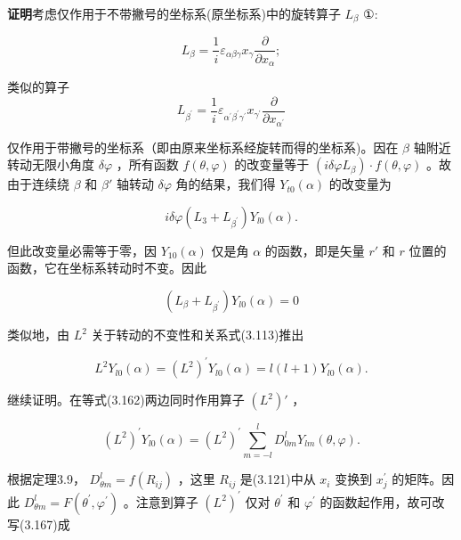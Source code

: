 \textbf{证明}\quad 考虑仅作用于不带撇号的坐标系(原坐标系)中的旋转算子 $L_{\beta}$ ①:

\begin{equation*}
L _ {\beta} = \frac {1}{i} \varepsilon_ {\alpha \beta \gamma} x _ {\gamma} \frac {\partial}{\partial x _ {\alpha}};
\end{equation*}

类似的算子
\begin{equation*}
L _ {\beta ^ {\prime}} = \frac {1}{i} \varepsilon_ {\alpha^ {\prime} \beta^ {\prime} \gamma^ {\prime}} x _ {\gamma^ {\prime}} \frac {\partial}{\partial x _ {\alpha ^ {\prime}}}
\end{equation*}

仅作用于带撇号的坐标系（即由原来坐标系经旋转而得的坐标系)。因在 $\beta$ 轴附近转动无限小角度 $\delta \varphi$ ，所有函数 $f(\theta, \varphi)$ 的改变量等于 $(i\delta \varphi L_{\beta}) \cdot f(\theta, \varphi)$ 。故由于连续绕 $\beta$ 和 $\beta'$ 轴转动 $\delta \varphi$ 角的结果，我们得 $Y_{t0}(\alpha)$ 的改变量为

\begin{equation*}
i \delta \varphi (L _ {3} + L _ {\beta ^ {\prime}}) Y _ {l 0} (\alpha).\tag{3.164}
\end{equation*}

但此改变量必需等于零，因 $Y_{10}(\alpha)$ 仅是角 $\alpha$ 的函数，即是矢量 $r'$ 和 $r$ 位置的函数，它在坐标系转动时不变。因此

\begin{equation*}
(L _ {\beta} + L _ {\beta^ {\prime}}) Y _ {l 0} (\alpha) = 0\tag{3.165}
\end{equation*}

类似地，由 $L^2$ 关于转动的不变性和关系式(3.113)推出

\begin{equation*}
L ^ {2} Y _ {l 0} (\alpha) = (L ^ {2}) ^ {\prime} Y _ {l 0} (\alpha) = l (l + 1) Y _ {l 0} (\alpha).\tag{3.166}
\end{equation*}

继续证明。在等式(3.162)两边同时作用算子 $(L^2)'$ ，

\begin{equation*}
(L ^ {2}) ^ {\prime} Y _ {l 0} (\alpha) = (L ^ {2}) ^ {\prime} \sum_ {m = - l} ^ {l} D _ {0 m} ^ {l} Y _ {l m} (\theta , \varphi).\tag{3.167}
\end{equation*}

根据定理3.9， $D_{\theta m}^{l} = f(R_{ij})$ ，这里 $R_{ij}$ 是(3.121)中从 $x_{i}$ 变换到 $x_{j}^{\prime}$ 的矩阵。因此 $D_{\theta m}^{l} = F(\theta^{\prime},\varphi^{\prime})$ 。注意到算子 $(L^2)^{\prime}$ 仅对 $\theta^{\prime}$ 和 $\varphi^{\prime}$ 的函数起作用，故可改写(3.167)成

